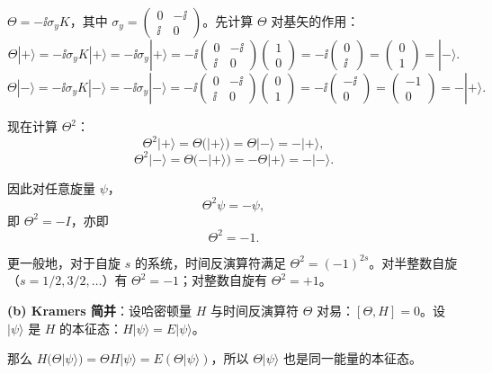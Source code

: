 \begin{solution}
	$\Theta = -\ii\sigma_y K$，其中 $\sigma_y = \begin{pmatrix}0&-\ii\\\ii&0\end{pmatrix}$。先计算 $\Theta$ 对基矢的作用：
	\[
	\Theta|+\rangle = -\ii\sigma_y K|+\rangle = -\ii\sigma_y|+\rangle
	= -\ii\begin{pmatrix}0&-\ii\\\ii&0\end{pmatrix}\begin{pmatrix}1\\0\end{pmatrix}
	= -\ii\begin{pmatrix}0\\\ii\end{pmatrix} = \begin{pmatrix}0\\1\end{pmatrix} = |-\rangle.
	\]
	\[
	\Theta|-\rangle = -\ii\sigma_y K|-\rangle = -\ii\sigma_y|-\rangle
	= -\ii\begin{pmatrix}0&-\ii\\\ii&0\end{pmatrix}\begin{pmatrix}0\\1\end{pmatrix}
	= -\ii\begin{pmatrix}-\ii\\0\end{pmatrix} = \begin{pmatrix}-1\\0\end{pmatrix} = -|+\rangle.
	\]

	现在计算 $\Theta^2$：
	\[
	\Theta^2|+\rangle = \Theta(|+\rangle) = \Theta|-\rangle = -|+\rangle,
	\]
	\[
	\Theta^2|-\rangle = \Theta(-|+\rangle) = -\Theta|+\rangle = -|-\rangle.
	\]

	因此对任意旋量 $\psi$，
	\[
	\Theta^2\psi = -\psi,
	\]
	即 $\Theta^2 = -I$，亦即
	\[
	\boxed{\Theta^2 = -1}.
	\]

	更一般地，对于自旋 $s$ 的系统，时间反演算符满足 $\Theta^2 = (-1)^{2s}$。对半整数自旋（$s=1/2,3/2,\ldots$）有 $\Theta^2=-1$；对整数自旋有 $\Theta^2=+1$。

		\textbf{(b) Kramers 简并}：设哈密顿量 $H$ 与时间反演算符 $\Theta$ 对易：$[\Theta,H]=0$。设 $|\psi\rangle$ 是 $H$ 的本征态：$H|\psi\rangle=E|\psi\rangle$。

		那么 $H(\Theta|\psi\rangle) = \Theta H|\psi\rangle = E(\Theta|\psi\rangle)$，所以 $\Theta|\psi\rangle$ 也是同一能量的本征态。


\end{solution}
